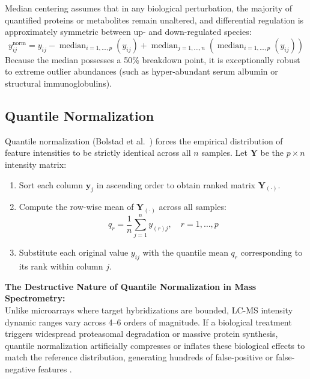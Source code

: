 \documentclass[11pt,oneside]{book}
\begin{document}
Median centering assumes that in any biological perturbation, the majority of quantified proteins or metabolites remain unaltered, and differential regulation is approximately symmetric between up- and down-regulated species:
\begin{equation}
y_{ij}^{\text{norm}} = y_{ij} - \operatorname{median}_{i=1,\dots,p}(y_{ij}) + \operatorname{median}_{j=1,\dots,n} \left( \operatorname{median}_{i=1,\dots,p}(y_{ij}) \right)
\end{equation}
Because the median possesses a 50\% breakdown point, it is exceptionally robust to extreme outlier abundances (such as hyper-abundant serum albumin or structural immunoglobulins).

\subsection{Quantile Normalization}

Quantile normalization (Bolstad et al.~\cite{bolstad2003comparison}) forces the empirical distribution of feature intensities to be strictly identical across all $n$ samples. Let $\mathbf{Y}$ be the $p \times n$ intensity matrix:
\begin{enumerate}
    \item Sort each column $\mathbf{y}_j$ in ascending order to obtain ranked matrix $\mathbf{Y}_{(\cdot)}$.
    \item Compute the row-wise mean of $\mathbf{Y}_{(\cdot)}$ across all samples:
    \begin{equation}
    q_r = \frac{1}{n} \sum_{j=1}^n y_{(r)j}, \quad r = 1, \dots, p
    \end{equation}
    \item Substitute each original value $y_{ij}$ with the quantile mean $q_r$ corresponding to its rank within column $j$.
\end{enumerate}

\begin{pitfallbox}
\textbf{The Destructive Nature of Quantile Normalization in Mass Spectrometry:}\\
Unlike microarrays where target hybridizations are bounded, LC-MS intensity dynamic ranges vary across 4--6 orders of magnitude. If a biological treatment triggers widespread proteasomal degradation or massive protein synthesis, quantile normalization artificially compresses or inflates these biological effects to match the reference distribution, generating hundreds of false-positive or false-negative features \cite{valikangas2018systematic}.
\end{pitfallbox}
\end{document}
